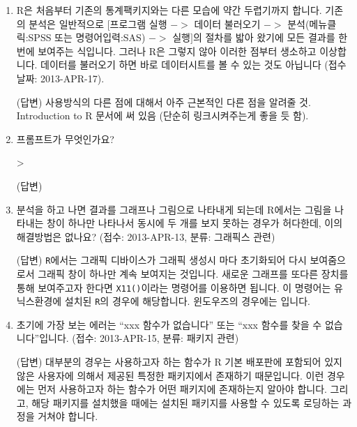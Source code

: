 \documentclass{article}
\begin{document}
\begin{enumerate}

	\item R은 처음부터 기존의 통계팩키지와는 다른 모습에 약간 두렵기까지 합니다.  기존의 분석은 일반적으로 $[$프로그램 실행 $->$ 데이터 불러오기 $->$ 분석(메뉴클릭:SPSS 또는 명령어입력:SAS) $->$ 실행$]$의 절차를 밟아 왔기에 모든 결과를 한 번에 보여주는 식입니다. 그러나 R은 그렇지 않아 이러한 점부터 생소하고 이상합니다.  데이터를 불러오기 하면 바로 데이터시트를 볼 수 있는 것도 아닙니다 (접수날짜: 2013-APR-17).

	\textsf{(답변)} 사용방식의 다른 점에 대해서 아주 근본적인 다른 점을 알려줄 것.  Introduction to R 문서에 써 있음 (단순히 링크시켜주는게 좋을 듯 함).

	\item 프롬프트가 무엇인가요? 
	\begin{Schunk}
	\begin{Soutput}
	>
	\end{Soutput}
	\end{Schunk}
	
	\textsf{(답변)} 
	
	\item 분석을 하고 나면 결과를 그래프나 그림으로 나타내게 되는데 R에서는 그림을 나타내는 창이 하나만 나타나서 동시에 두 개를 보지 못하는 경우가 허다한데, 이의 해결방법은 없나요? (접수: 2013-APR-13, 분류: 그래픽스 관련) 
	
	\textsf{(답변)} \texttt{R}에서는 그래픽 디바이스가 그래픽 생성시 마다 초기화되어 다시 보여줌으로서 그래픽 창이 하나만 계속 보여지는 것입니다.  새로운 그래프를 또다른 장치를 통해 보여주고자 한다면 \texttt{X11()}이라는 명령어를 이용하면 됩니다.  이 명령어는 유닉스환경에 설치된 \texttt{R}의 경우에 해당합니다.  윈도우즈의 경우에는 \texttt{}입니다. 

	\item 초기에 가장 보는 에러는 ``xxx 함수가 없습니다'' 또는 ``xxx 함수를 찾을 수 없습니다''입니다. (접수: 2013-APR-15, 분류: 패키지 관련) 
	
	\textsf{(답변)} 대부분의 경우는 사용하고자 하는 함수가 R 기본 배포판에 포함되어 있지 않은 사용자에 의해서 제공된 특정한 패키지에서 존재하기 때문입니다.  	이런 경우에는 먼저 사용하고자 하는 함수가 어떤 패키지에 존재하는지 알아야 합니다.  그리고, 해당 패키지를 설치했을 때에는 설치된 패키지를 사용할 수 있도록 로딩하는 과정을 거쳐야 합니다.


\end{enumerate}
\end{document}
